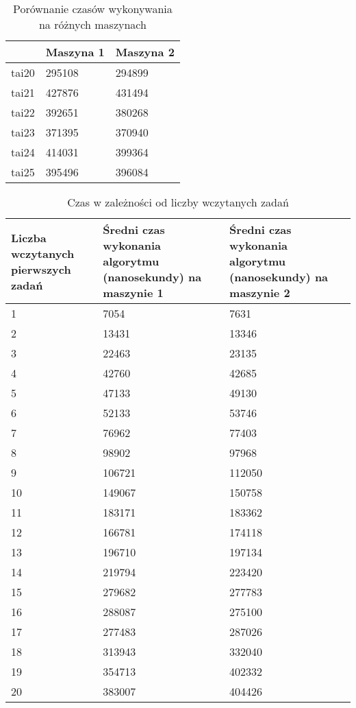 \documentclass[]{article}
\begin{document}
\begin{table}[h]
	\centering
	\caption{Porównanie czasów wykonywania na różnych maszynach}
	\begin{tabular}{|l|l|l|}
		\hline
		
		 & Maszyna 1 & Maszyna 2 \\ \hline
		tai20 & 295108 & 294899 \\ \hline
		tai21 & 427876 & 431494 \\ \hline
		tai22 & 392651 & 380268 \\ \hline
		tai23 & 371395 & 370940 \\ \hline
		tai24 & 414031 & 399364 \\ \hline
		tai25 & 395496 & 396084 \\ \hline
		
	\end{tabular}
\end{table}


\begin{table}[h]
	\centering
	\caption{Czas w zależności od liczby wczytanych zadań}
	\begin{tabular}{|p{}|p{}|p{}|}
		\hline
		
		Liczba wczytanych pierwszych zadań  & Średni czas wykonania algorytmu (nanosekundy) na maszynie 1  & Średni czas wykonania algorytmu (nanosekundy) na maszynie 2  \\ \hline
		1  & 7054  & 7631  \\ \hline
		2  & 13431  & 13346  \\ \hline
		3  & 22463  & 23135  \\ \hline
		4  & 42760  & 42685  \\ \hline
		5  & 47133  & 49130  \\ \hline
		6  & 52133  & 53746  \\ \hline
		7  & 76962  & 77403  \\ \hline
		8  & 98902  & 97968  \\ \hline
		9  & 106721  & 112050  \\ \hline
		10  & 149067  & 150758  \\ \hline
		11  & 183171  & 183362  \\ \hline
		12  & 166781  & 174118  \\ \hline
		13  & 196710  & 197134  \\ \hline
		14  & 219794  & 223420  \\ \hline
		15  & 279682  & 277783  \\ \hline
		16  & 288087  & 275100  \\ \hline
		17  & 277483  & 287026  \\ \hline
		18  & 313943  & 332040  \\ \hline
		19  & 354713  & 402332  \\ \hline
		20  & 383007  & 404426 \\ \hline
		
	\end{tabular}
\end{table}
\end{document}
